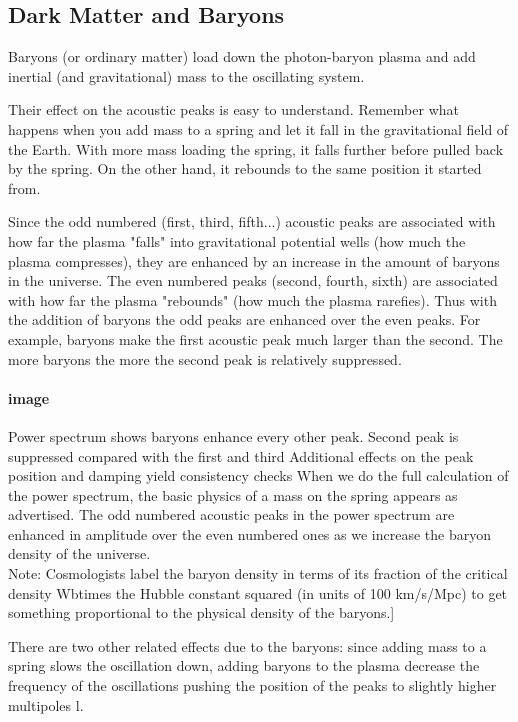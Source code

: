 \documentclass{article}
\begin{document}
\subsection{Dark Matter and Baryons}
Baryons (or ordinary matter) load down the photon-baryon plasma and add inertial (and gravitational) mass to the oscillating system.

Their effect on the acoustic peaks is easy to understand.  Remember what happens when you add mass to a spring and let it fall in the gravitational field of the Earth.  With more mass loading the spring, it falls further before pulled back by the spring.  On the other hand, it rebounds to the same position it started from. 

Since the odd numbered (first, third, fifth...) acoustic peaks are associated with how far the plasma "falls" into gravitational potential wells (how much the plasma compresses), they are enhanced by an increase in the amount of baryons in the universe.   The even numbered peaks (second, fourth, sixth) are associated with how far the plasma "rebounds" (how much the plasma rarefies).  Thus with the addition of baryons the odd peaks are enhanced over the even peaks.  For example, baryons make the first acoustic peak much larger than the second.  The more baryons the more the second peak is relatively suppressed. 
\par

\paragraph{image}
Power spectrum shows baryons enhance every other peak.
Second peak is suppressed compared with the first and third
Additional effects on the peak position and damping yield consistency checks
When we do the full calculation of the power spectrum, the basic physics of a mass on the spring appears as advertised.   The odd numbered acoustic peaks in the power spectrum are enhanced in amplitude over the even numbered ones as we increase the baryon density of the universe.\\
Note: Cosmologists label the baryon density in terms of its fraction of the critical density Wbtimes the Hubble constant squared (in units of 100 km/s/Mpc) to get something proportional to the physical density of the baryons.]

There are two other related effects due to the baryons:  since adding mass to a spring slows the oscillation down, adding baryons to the plasma decrease the frequency of the oscillations pushing the position of the peaks to slightly higher multipoles l.
\end{document}
